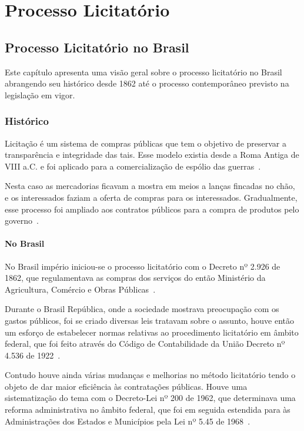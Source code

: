 \part{Processo Licitatório}

\chapter[Processo Licitatório no Brasil]{Processo Licitatório no Brasil}\label{Capitulo1}

Este capítulo apresenta uma visão geral sobre o processo licitatório no Brasil abrangendo seu histórico desde 1862 até o processo contemporâneo previsto na legislação em vigor.

\section{Histórico}

Licitação é um sistema de compras públicas que tem o objetivo de preservar a transparência e integridade das tais.
Esse modelo existia desde a Roma Antiga de VIII a.C. e foi aplicado para a comercialização de espólio das guerras~\cite{prestes2004guia}. 

Nesta caso as mercadorias ficavam a mostra em meios a lanças fincadas no chão, e os interessados faziam a oferta de compras para os interessados. 
Gradualmente, esse processo foi ampliado aos contratos públicos para a compra de produtos pelo governo~\cite{prestes2004guia}.

\subsection{No Brasil}

No Brasil império iniciou-se o processo licitatório com o Decreto nº 2.926 de 1862, que regulamentava as compras dos serviços do então Ministério da Agricultura, Comércio e Obras Públicas~\cite{de8processo}. 

Durante o Brasil República, onde a sociedade mostrava preocupação com os gastos públicos, foi se criado diversas leis tratavam sobre o assunto, houve então um esforço de estabelecer normas relativas ao procedimento licitatório em âmbito federal, que foi feito através do Código de Contabilidade da União Decreto nº 4.536 de 1922~\cite{oliveira2013}.

Contudo houve ainda várias mudanças e melhorias no método licitatório tendo o objeto de dar maior eficiência às contratações públicas.
Houve uma sistematização do tema com o Decreto-Lei nº 200 de 1962, que determinava uma reforma administrativa no âmbito federal, que foi em seguida estendida para às Administrações dos Estados e Municípios pela Lei nº 5.45 de 1968~\cite{ribeiro2007evoluccao}.

